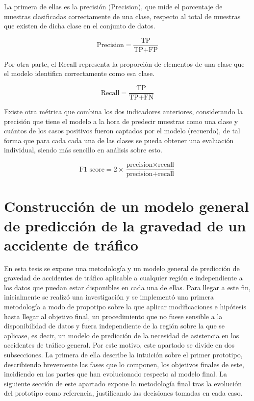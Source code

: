 \documentclass{uathesis-es}
\begin{document}
{	La primera de ellas es la precisión (Precision), que mide el porcentaje de muestras clasificadas correctamente de una clase, respecto al total de muestras que existen de dicha clase en el conjunto de datos.
	
	$$\text{Precision} = \frac{{\text{TP}}}{{\text{TP} + \text{FP}}}$$
	
	Por otra parte, el Recall representa la proporción de elementos de una clase que el modelo identifica correctamente como esa clase.
	
	$$\text{Recall} = \frac{{\text{TP}}}{{\text{TP} + \text{FN}}}$$
	
	Existe otra métrica que combina los dos indicadores anteriores, considerando la precisión que tiene el modelo a la hora de predecir muestras como una clase y cuántos de los casos positivos fueron captados por el modelo (recuerdo), de tal forma que para cada cada una de las clases se pueda obtener una evaluación individual, siendo más sencillo en análisis sobre esto. 
	
	$$\text{F1 score} = 2 \times \frac{{\text{precision} \times \text{recall}}}{{\text{precision} + \text{recall}}}$$
	
	
	\chapter{Construcción de un modelo general de predicción de la gravedad de un accidente de tráfico}
	
	En esta tesis se expone una metodología y un modelo general de predicción de gravedad de accidentes de tráfico aplicable a cualquier región e independiente a los datos que puedan estar disponibles en cada una de ellas. Para llegar a este fin, inicialmente se realizó una investigación y se implementó una primera metodología a modo de propotipo sobre la que aplicar modificaciones e hipótesis hasta llegar al objetivo final, un procedimiento que no fuese sensible a la disponibilidad de datos y fuera independiente de la región sobre la que se aplicase, es decir, un modelo de predicción de la necesidad de asistencia en los accidentes de tráfico general. Por este motivo, este apartado se divide en dos subsecciones. La primera de ella describe la intuición sobre el primer prototipo, describiendo brevemente las fases que lo componen, los objetivos finales de este, incidiendo en las partes que han evolucionado respecto al modelo final. La siguiente sección de este apartado expone la metodología final tras la evolución del prototipo como referencia, justificando las decisiones tomadas en cada caso.
	
}
\end{document}
